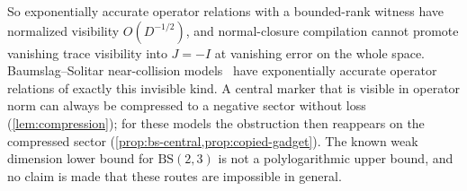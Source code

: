 So exponentially accurate operator relations with a bounded-rank witness have normalized visibility $O(D^{-1/2})$, and
normal-closure compilation cannot promote vanishing trace visibility into $J=-I$ at vanishing error on the whole space.
Baumslag--Solitar near-collision models~\cite{SV18,Fri12} have exponentially accurate operator relations of exactly this
invisible kind. A central marker that is visible in operator norm can always be compressed to a negative sector without loss
(\cref{lem:compression}); for these models the obstruction then reappears on the compressed sector
(\cref{prop:bs-central,prop:copied-gadget}). The known weak dimension lower bound for $\mathrm{BS}(2,3)$ is not a
polylogarithmic upper bound, and no claim is made that these routes are impossible in general.
